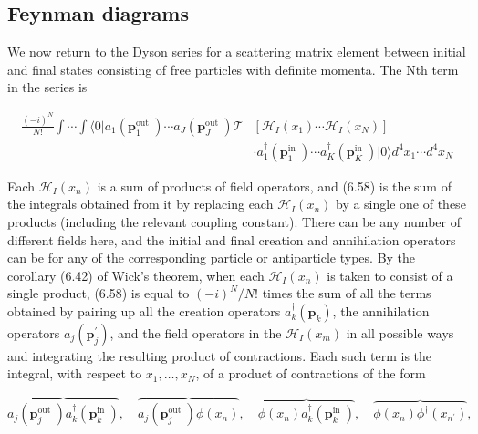 \documentclass[10pt, letterpaper]{article}
\begin{document}
\subsection*{Feynman diagrams}
We now return to the Dyson series for a scattering matrix element between initial and final states consisting of free particles with definite momenta. The Nth term in the series is

$$
\begin{aligned}
\frac{(-i)^{N}}{N!} \int \cdots \int\langle 0| a_{1}\left(\mathbf{p}_{1}^{\text {out }}\right) \cdots a_{J}\left(\mathbf{p}_{J}^{\text {out }}\right) \mathcal{T} & {\left[\mathcal{H}_{I}\left(x_{1}\right) \cdots \mathcal{H}_{I}\left(x_{N}\right)\right] } \\
& \cdot a_{1}^{\dagger}\left(\mathbf{p}_{1}^{\text {in }}\right) \cdots a_{K}^{\dagger}\left(\mathbf{p}_{K}^{\text {in }}\right)|0\rangle d^{4} x_{1} \cdots d^{4} x_{N}
\end{aligned}
$$

Each $\mathcal{H}_{I}\left(x_{n}\right)$ is a sum of products of field operators, and (6.58) is the sum of the integrals obtained from it by replacing each $\mathcal{H}_{I}\left(x_{n}\right)$ by a single one of these products (including the relevant coupling constant). There can be any number of different fields here, and the initial and final creation and annihilation operators can be for any of the corresponding particle or antiparticle types. By the corollary (6.42) of Wick's theorem, when each $\mathcal{H}_{I}\left(x_{n}\right)$ is taken to consist of a single product, (6.58) is equal to $(-i)^{N} / N!$ times the sum of all the terms obtained by pairing up all the creation operators $a_{k}^{\dagger}\left(\mathbf{p}_{k}\right)$, the annihilation operators $a_{j}\left(\mathbf{p}_{j}^{\prime}\right)$, and the field operators in the $\mathcal{H}_{I}\left(x_{m}\right)$ in all possible ways and integrating the resulting product of contractions. Each such term is the integral, with respect to $x_{1}, \ldots, x_{N}$, of a product of contractions of the form

$$
\overbrace{a_{j}\left(\mathbf{p}_{j}^{\text {out }}\right) a_{k}^{\dagger}\left(\mathbf{p}_{k}^{\text {in }}\right)}, \quad \overbrace{a_{j}\left(\mathbf{p}_{j}^{\text {out }}\right) \phi\left(x_{n}\right)}, \quad \overbrace{\phi\left(x_{n}\right) a_{k}^{\dagger}\left(\mathbf{p}_{k}^{\text {in }}\right)}, \quad \overbrace{\phi\left(x_{n}\right) \phi^{\dagger}\left(x_{n^{\prime}}\right)},
$$
\end{document}
